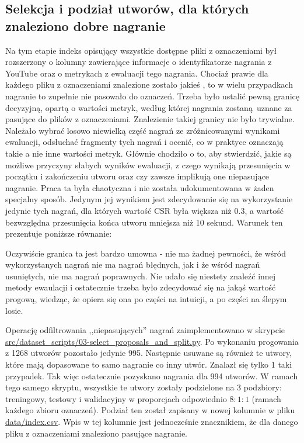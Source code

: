 \subsection{Selekcja i podział utworów, dla których znaleziono dobre nagranie}
Na tym etapie indeks opisujący wszystkie dostępne pliki z oznaczeniami był rozszerzony o kolumny
zawierające informacje o identyfikatorze nagrania z YouTube oraz o metrykach z ewaluacji tego
nagrania. Chociaż prawie dla każdego pliku z oznaczeniami znalezione zostało jakieś
, to w wielu przypadkach nagranie to zupełnie nie pasowało do oznaczeń. Trzeba było
ustalić pewną granicę decyzyjną, opartą o wartości metryk, według której nagrania zostaną uznane za
pasujące do plików z oznaczeniami. Znalezienie takiej granicy nie było trywialne. Należało wybrać
losowo niewielką część nagrań ze zróżnicowanymi wynikami ewaluacji, odsłuchać fragmenty tych nagrań
i ocenić, co w praktyce oznaczają takie a nie inne wartości metryk. Głównie chodziło o to, aby
stwierdzić, jakie są możliwe przyczyny słabych wyników ewaluacji, z czego wynikają przesunięcia w
początku i zakończeniu utworu oraz czy zawsze implikują one niepasujące nagranie. Praca ta była
chaotyczna i nie została udokumentowana w żaden specjalny sposób. Jedynym jej wynikiem jest
zdecydowanie się na wykorzystanie jedynie tych nagrań, dla których wartość CSR była większa niż
0.3, a wartość bezwzględna przesunięcia końca utworu mniejsza niż 10 sekund. Warunek ten prezentuje
poniższe równanie:
\begin{center}
\end{center}
Oczywiście granica ta jest bardzo umowna - nie ma żadnej pewności, że wśród wykorzystanych nagrań
nie ma nagrań błędnych, jak i że wśród nagrań usuniętych, nie ma nagrań poprawnych. Nie udało się
niestety znaleźć innej metody ewaulacji i ostatecznie trzeba było zdecydować się na jakąś wartość
progową, wiedząc, że opiera się ona po części na intuicji, a po części na ślepym losie.

Operację odfiltrowania ,,niepasujących'' nagrań zaimplementowano w skrypcie
\url{src/dataset\_scripts/03-select\_proposals\_and\_split.py}. Po wykonaniu progowania z 1268 utworów
pozostało jedynie 995. Następnie usuwane są również te utwory, które mają dopasowane to samo
nagranie co inny utwór. Znalazł się tylko 1 taki przypadek. Tak więc ostatecznie pozyskano nagrania
dla 994 utworów. W ramach tego samego skryptu, wszystkie te utwory zostały podzielone na 3
podzbiory: treningowy, testowy i walidacyjny w proporcjach odpowiednio $8:1:1$ (ramach każdego
zbioru oznaczeń). Podział ten został zapisany w nowej kolumnie  w pliku
\url{data/index.csv}. Wpis w tej kolumnie jest jednocześnie znacznikiem, że dla danego pliku z
oznaczeniami znaleziono pasujące nagranie.

